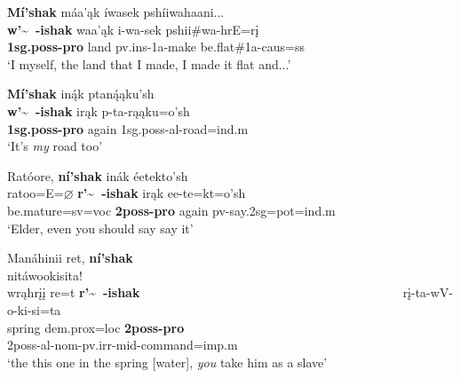 \begin{exe}
\begin{xlist}
    \item\label{EmphaticPronounEx4} \glll \textbf{Mí'shak} máa'ąk íwasek pshíiwahaani...\\
    \textbf{w'\~~-ishak} waa'ąk i-wa-sek pshii\#wa-hrE=rį\\
    \textbf{1sg.poss-pro} \textnormal{land} pv.ins-1a-\textnormal{make} \textnormal{be.flat}\#1a-caus=ss\\
    \glt `I myself, the land that I made, I made it flat and...' \citep[4]{hollow1973a}
    
    \item\label{EmphaticPronounEx5} \glll \textbf{Mí'shak} iną́k ptaną́ąku'sh\\
    \textbf{w'\~~-ishak} irąk p-ta-rąąku=o'sh\\
    \textbf{1sg.poss-pro} \textnormal{again} 1sg.poss-al-\textnormal{road}=ind.m\\
    \glt `It's \textit{my} road too' \citep[24]{hollow1973a}
    
    \item\label{EmphaticPronounEx6} \glll Ratóore, \textbf{ní'shak} inák éetekto'sh\\
    ratoo=E=$\varnothing$ \textbf{r'\~~-ishak} irąk ee-te=kt=o'sh\\
    \textnormal{be.mature}=sv=voc \textbf{2poss-pro} \textnormal{again} pv-\textnormal{say}.2sg=pot=ind.m\\
    \glt `Elder, even you should say say it' \citep[30]{hollow1973a}
    
    \item\label{EmphaticPronounEx7} \glll Manáhinii ret, \textbf{ní'shak} ~ ~ ~ ~ ~ ~ ~ ~ ~ ~ ~ ~ ~ ~ ~ ~ ~ ~ ~ ~ ~ ~ ~ ~ ~ nitáwookisita!\\
    wrąhrįį re=t \textbf{r'\~~-ishak} ~ ~ ~ ~ ~ ~ ~ ~ ~ ~ ~ ~ ~ ~ ~ ~ ~ ~ ~ ~ ~ ~ ~ ~ ~ rį-ta-wV-o-ki-si=ta\\
    \textnormal{spring} dem.prox=loc \textbf{2poss-pro} ~ ~ ~ ~ ~ ~ ~ ~ ~ ~ ~ ~ ~ ~ ~ ~ ~ ~ ~ ~ ~ ~ ~ ~ ~ 2poss-al-nom-pv.irr-mid-\textnormal{command}=imp.m\\
    \glt `the this one in the spring [water], \textit{you} take him as a slave' \citep[158]{hollow1973a}
    
    \end{xlist}

\end{exe}

